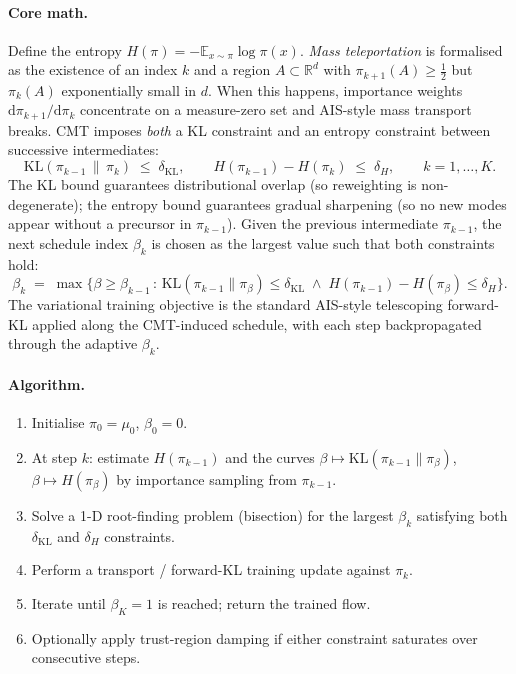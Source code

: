 \documentclass[11pt,letterpaper]{article}
\newcommand{\E}{\mathbb{E}}
\newcommand{\Real}{\mathbb{R}}
\newcommand{\KLdiv}{\mathrm{KL}}
\newcommand{\Le}{\leqslant}
\newcommand{\Ge}{\geqslant}
\newcommand{\dd}{\mathrm{d}}
\theoremstyle{plain}
\begin{document}
\paragraph{Core math.} Define the entropy $H(\pi)=-\E_{x\sim\pi}\log\pi(x)$.
\emph{Mass teleportation} is formalised as the existence of an index $k$ and
a region $A\subset\Real^d$ with $\pi_{k+1}(A)\Ge\tfrac12$ but $\pi_k(A)$
exponentially small in $d$. When this happens, importance weights
$\dd\pi_{k+1}/\dd\pi_k$ concentrate on a measure-zero set and AIS-style
mass transport breaks. CMT imposes \emph{both} a KL constraint and an
entropy constraint between successive intermediates:
\[
  \KLdiv(\pi_{k-1}\,\|\,\pi_k)\;\Le\;\delta_{\mathrm{KL}},
  \qquad
  H(\pi_{k-1})-H(\pi_k)\;\Le\;\delta_H,
  \qquad k=1,\ldots,K.
\]
The KL bound guarantees distributional overlap (so reweighting is
non-degenerate); the entropy bound guarantees gradual sharpening (so no new
modes appear without a precursor in $\pi_{k-1}$). Given the previous
intermediate $\pi_{k-1}$, the next schedule index $\beta_k$ is chosen as the
largest value such that both constraints hold:
\[
  \beta_k \;=\; \max\big\{\beta\Ge\beta_{k-1}\,:\,
    \KLdiv(\pi_{k-1}\|\pi_\beta)\Le\delta_{\mathrm{KL}}\;\wedge\;
    H(\pi_{k-1})-H(\pi_\beta)\Le\delta_H\big\}.
\]
The variational training objective is the standard AIS-style telescoping
forward-KL applied along the CMT-induced schedule, with each step
backpropagated through the adaptive $\beta_k$.

\paragraph{Algorithm.}
\begin{enumerate}\setlength{\itemsep}{1pt}
  \item Initialise $\pi_0=\mu_0$, $\beta_0=0$.
  \item At step $k$: estimate $H(\pi_{k-1})$ and the curves
    $\beta\mapsto\KLdiv(\pi_{k-1}\|\pi_\beta)$,
    $\beta\mapsto H(\pi_\beta)$ by importance sampling from $\pi_{k-1}$.
  \item Solve a 1-D root-finding problem (bisection) for the largest $\beta_k$
    satisfying both $\delta_{\mathrm{KL}}$ and $\delta_H$ constraints.
  \item Perform a transport / forward-KL training update against $\pi_k$.
  \item Iterate until $\beta_K=1$ is reached; return the trained flow.
  \item Optionally apply trust-region damping if either constraint saturates
    over consecutive steps.
\end{enumerate}
\end{document}
